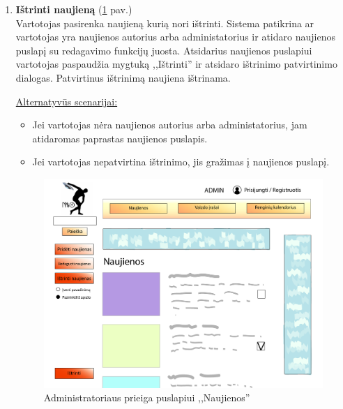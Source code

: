 \documentclass{VUMIFPSkursinis}
\begin{document}
\begin{enumerate} [label = \textbf{U\arabic*.}]
			\item \textbf{Ištrinti naujieną} (\ref{fig:uzd_admin_puslapisNaujienos} pav.)\\
					Vartotojas pasirenka naujieną kurią nori ištrinti. Sistema patikrina ar vartotojas yra naujienos autorius arba administatorius ir atidaro naujienos puslapį su redagavimo funkcijų juosta. Atsidarius naujienos puslapiui vartotojas paspaudžia mygtuką ,,Ištrinti'' ir atsidaro ištrinimo patvirtinimo dialogas. Patvirtinus ištrinimą naujiena ištrinama.
					
					\underline{Alternatyvūs scenarijai:}
					\begin{itemize}
						\item Jei vartotojas nėra naujienos autorius arba administatorius, jam atidaromas paprastas naujienos puslapis.
						\item Jei vartotojas nepatvirtina ištrinimo, jis gražimas į naujienos puslapį.
					\end{itemize}
				
					\begin{figure}[H]
						\centering
						\includegraphics[width=\textwidth]{img/PSI4/AdminNaujienos-01.jpg}
						\caption{Administratoriaus prieiga puslapiui ,,Naujienos''}
						\label{fig:uzd_admin_puslapisNaujienos}
					\end{figure}
					

\end{enumerate}
\end{document}
